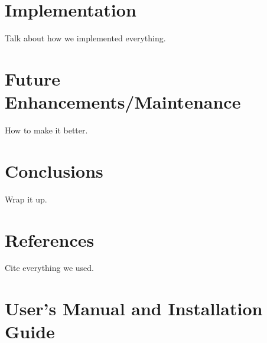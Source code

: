 \documentclass{article}
\begin{document}
\section{Implementation}
Talk about how we implemented everything.

\section{Future Enhancements/Maintenance}
How to make it better.

\section{Conclusions}
Wrap it up.

\section{References}
Cite everything we used.

\section{User's Manual and Installation Guide}
\end{document}
